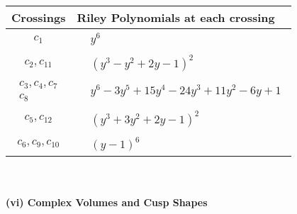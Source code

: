 \documentclass[1p]{elsarticle_modified}
\theoremstyle{definition}
\begin{document}
\begin{tabular}{m{50pt}|m{274pt}}
Crossings & \hspace{64pt}Riley Polynomials at each crossing \\
\hline $$\begin{aligned}c_{1}\end{aligned}$$&$\begin{aligned}
&y^6
\end{aligned}$\\
\hline $$\begin{aligned}c_{2},c_{11}\end{aligned}$$&$\begin{aligned}
&(y^3- y^2+2 y-1)^2
\end{aligned}$\\
\hline $$\begin{aligned}c_{3},c_{4},c_{7}\\c_{8}\end{aligned}$$&$\begin{aligned}
&y^6-3 y^5+15 y^4-24 y^3+11 y^2-6 y+1
\end{aligned}$\\
\hline $$\begin{aligned}c_{5},c_{12}\end{aligned}$$&$\begin{aligned}
&(y^3+3 y^2+2 y-1)^2
\end{aligned}$\\
\hline $$\begin{aligned}c_{6},c_{9},c_{10}\end{aligned}$$&$\begin{aligned}
&(y-1)^6
\end{aligned}$\\
\hline
\end{tabular}\\~\\
\newpage\flushleft \textbf{(vi) Complex Volumes and Cusp Shapes}
\end{document}
